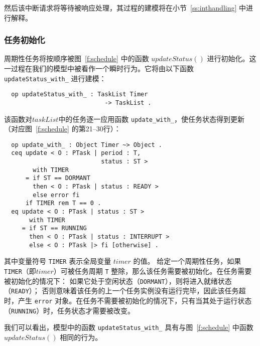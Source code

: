 然后该中断请求将等待被响应处理，其过程的建模将在小节~\ref{ss:inthandling} 中进行解释。

\subsubsection{任务初始化}
\label{ss:init}
周期性任务将按顺序被图~\ref{f:schedule} 中的函数 $\mathit{updateStatus()}$ 进行初始化。这一过程在我们的模型中被看作一个瞬时行为。它将由以下函数 \verb|updateStatus_with_| 进行建模：
\begin{verbatim}
  op updateStatus_with_ : TaskList Timer 
                            -> TaskList . 
\end{verbatim}
该函数对$\mathit{taskList}$中的任务逐一应用函数 \verb|update_with_|，使任务状态得到更新（对应图~\ref{f:schedule} 的第21--30行）：
\begin{verbatim}
  op update_with_ : Object Timer ~> Object .
  ceq update < O : PTask | period : T, 
                           status : ST > 
        with TIMER
      = if ST == DORMANT 
        then < O : PTask | status : READY >
        else error fi
      if TIMER rem T == 0 .
  eq update < O : PTask | status : ST > 
       with TIMER
     = if ST == RUNNING 
       then < O : PTask | status : INTERRUPT >
       else < O : PTask |> fi [otherwise] .
\end{verbatim}
其中变量符号 \verb|TIMER| 表示全局变量 $\mathit{timer}$ 的值。
给定一个周期性任务，如果 \verb|TIMER|（即$\mathit{timer}$）可被任务周期 \verb|T| 整除，那么该任务需要被初始化。在任务需要被初始化的情况下：
如果它处于空闲状态（\verb|DORMANT|），则将进入就绪状态（\verb|READY|）；
否则意味着该任务的上一个任务实例没有运行完毕，因此该任务超时，产生
\verb|error| 对象。在任务不需要被初始化的情况下，只有当其处于运行状态（\verb|RUNNING|）时，任务状态才需要被改变。

我们可以看出，模型中的函数 \verb|updateStatus_with_| 具有与图~\ref{f:schedule} 中函数 $\mathit{updateStatus()}$ 相同的行为。

